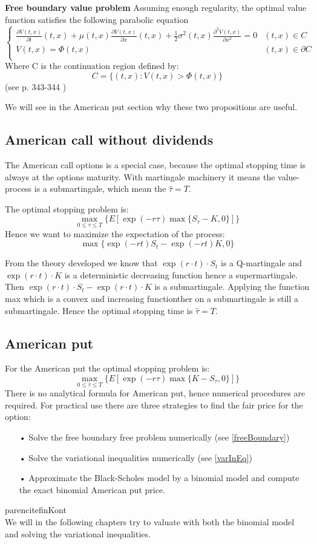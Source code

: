 \begin{proposition}{\textbf{Free boundary value problem}}\label{freeBoundary}
Assuming enough regularity, the optimal value function satisfies the following parabolic equation
\[ \begin{cases} 
      \frac{\partial V(t,x)}{\partial t}(t,x) + \mu(t,x) \frac{\partial V(t,x)}{\partial x}(t,x) + \frac{1}{2}\sigma^2(t,x)\frac{\partial^2 V(t,x)}{\partial x^2}=0 & (t,x)\in C \\
     V(t,x)=\Phi(t,x)  & (t,x)\in \partial C \\
   \end{cases}
\]
Where C is the continuation region defined by:
$$C=\{(t,x): V(t,x)>\Phi(t,x) \}$$
(see p. 343-344 \parencite{finKont})
\end{proposition}

We will see in the American put section why these two propositions are useful.

\subsection{American call without dividends}
The American call options is a special case, because the optimal stopping time is always at the options maturity. With martingale machinery it means the value-process is a submartingale, which mean the $\hat{\tau}=T$.

The optimal stopping problem is:
$$\max_{0 \leq \tau\leq T}\{E[\exp(-r \tau) \max\{S_{\tau} - K, 0\}]\}$$
Hence we want to maximize the expectation of the process:
$$ \max\{ \exp(-r t) S_{t} - \exp(-r t) K, 0 \}$$

From the theory developed we know that $\exp(r\cdot t) \cdot S_t$ is a Q-martingale and $\exp(r\cdot t) \cdot K$ is a deterministic decreasing function hence a supermartingale. Then $\exp(r\cdot t) \cdot S_t - \exp(r\cdot t) \cdot K$ is a submartingale. Applying the function max which is a convex and increasing functionther on a submartingale is still a submartingale. Hence the optimal stopping time is $\hat{\tau}=T$.

\subsection{American put}
For the American put the optimal stopping problem is:
$$\max_{0 \leq \tau\leq T}\{E[\exp(-r \tau) \max\{K - S_{\tau}, 0\}]\}$$
There is no analytical formula for American put, hence numerical procedures are required. For practical use there are three strategies to find the fair price for the option:
\begin{enumerate}
\item[•] Solve the free boundary free problem numerically (see \ref{freeBoundary})
\item[•] Solve the variational inequalities numerically (see \ref{varInEq})
\item[•] Approximate the Black-Scholes model by a binomial model and compute the exact binomial American put price.
\end{enumerate}
parencite{finKont}\\

We will in the following chapters try to valuate with both the binomial model and solving the variational inequalities.
